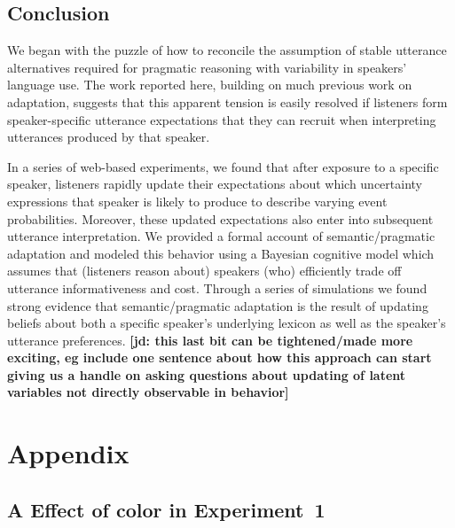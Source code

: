 \documentclass[man, floatsintext]{apa6}
\newcommand{\jd}[1]{\textcolor{PinkyPurple}{\textbf{[jd: #1]}}}
\begin{document}
\subsection{Conclusion}

We began with the puzzle of how to reconcile the assumption of stable utterance alternatives required for pragmatic reasoning with variability in speakers'  language use. The work reported here, building on much previous work on adaptation, suggests that this apparent tension is easily resolved if listeners form speaker-specific utterance expectations that they can recruit when interpreting utterances produced by that speaker.

In a series of web-based experiments, we found that after exposure to a specific speaker, listeners rapidly update 
their expectations about which uncertainty expressions that speaker is likely to produce
to describe varying event probabilities. Moreover, these updated expectations also enter into subsequent utterance interpretation.
We provided a formal account of semantic/pragmatic adaptation and modeled this behavior using a Bayesian cognitive model 
which assumes that (listeners reason about) speakers (who) efficiently trade off utterance informativeness and cost.
Through a series of simulations we found strong evidence that semantic/pragmatic adaptation is the result of
updating beliefs about both a specific speaker's underlying lexicon as well as the speaker's utterance
preferences. \jd{this last bit can be tightened/made more exciting, eg include one sentence about how this approach can start giving us a handle on asking questions about updating of latent variables not directly observable in behavior}



\printbibliography

\pagebreak


\section*{Appendix}

\subsection*{A Effect of color in Experiment~1}
\end{document}
